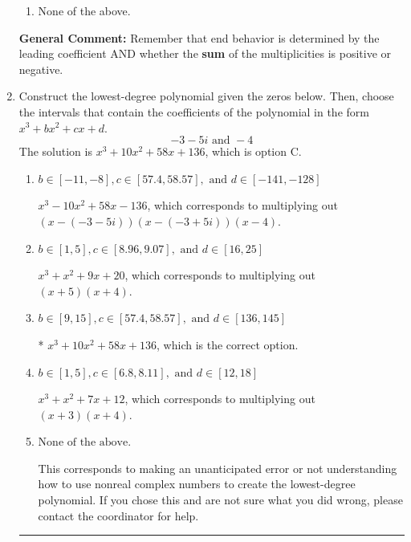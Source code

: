 \documentclass{extbook}[14pt]
\newcommand{\litem}[1]{\item #1

\rule{\textwidth}{0.4pt}}
\begin{document}
\begin{enumerate}
{\begin{enumerate}[label=\Alph*.]
\begin{multicols}{2}
\end{multicols}\item None of the above.\end{enumerate}
\textbf{General Comment:} Remember that end behavior is determined by the leading coefficient AND whether the \textbf{sum} of the multiplicities is positive or negative.
}
\litem{
Construct the lowest-degree polynomial given the zeros below. Then, choose the intervals that contain the coefficients of the polynomial in the form $x^3+bx^2+cx+d$.
\[ -3 - 5 i \text{ and } -4 \]The solution is \( x^{3} +10 x^{2} +58 x + 136 \), which is option C.\begin{enumerate}[label=\Alph*.]
\item \( b \in [-11, -8], c \in [57.4, 58.57], \text{ and } d \in [-141, -128] \)

$x^{3} -10 x^{2} +58 x -136$, which corresponds to multiplying out $(x-(-3 - 5 i))(x-(-3 + 5 i))(x -4)$.
\item \( b \in [1, 5], c \in [8.96, 9.07], \text{ and } d \in [16, 25] \)

$x^{3} + x^{2} +9 x + 20$, which corresponds to multiplying out $(x + 5)(x + 4)$.
\item \( b \in [9, 15], c \in [57.4, 58.57], \text{ and } d \in [136, 145] \)

* $x^{3} +10 x^{2} +58 x + 136$, which is the correct option.
\item \( b \in [1, 5], c \in [6.8, 8.11], \text{ and } d \in [12, 18] \)

$x^{3} + x^{2} +7 x + 12$, which corresponds to multiplying out $(x + 3)(x + 4)$.
\item \( \text{None of the above.} \)

This corresponds to making an unanticipated error or not understanding how to use nonreal complex numbers to create the lowest-degree polynomial. If you chose this and are not sure what you did wrong, please contact the coordinator for help.
\end{enumerate}

}
\end{enumerate}
\end{document}
